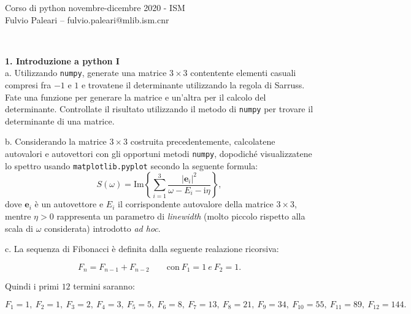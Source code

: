 \documentclass[addpoints]{exam}
\newenvironment{palatino}{\fontfamily{ppl}\selectfont}{\par}
\begin{document}
\begin{palatino}

\noindent Corso di python novembre-dicembre 2020 - ISM \\
\noindent Fulvio Paleari -- fulvio.paleari@mlib.ism.cnr

\hrulefill
\vspace{0.2in}\\
\setlength{\parindent}{0pt}

\textbf{1. Introduzione a python I} \\

a. \quad Utilizzando \texttt{numpy}, generate una matrice $3\times 3$ contentente elementi casuali compresi fra $-1$ e $1$ e trovatene il determinante utilizzando la regola di Sarruss. Fate una funzione per generare la matrice e un'altra per il calcolo del determinante. Controllate il risultato utilizzando il metodo di \texttt{numpy} per trovare il determinante di una matrice.

\hphantom{ciao}

b. Considerando la matrice $3\times 3$ costruita precedentemente, calcolatene autovalori e autovettori con gli opportuni metodi \texttt{numpy}, dopodiché visualizzatene lo spettro usando \texttt{matplotlib.pyplot} secondo la seguente formula:
\begin{equation*}
	S(\omega)= \mathrm{Im}\left\{\sum_{i=1}^3 \frac{|\mathbf{e}_i|^2}{\omega-E_i-\mathrm{i}\eta} \right\},
\end{equation*} 
dove $\mathbf{e}_i$ è un autovettore e $E_i$ il corrispondente autovalore della matrice $3\times 3$, mentre $\eta>0$ rappresenta un parametro di \textit{linewidth} (molto piccolo rispetto alla scala di $\omega$ considerata) introdotto \textit{ad hoc}.

\hphantom{ciao}

c. \quad La sequenza di Fibonacci è definita dalla seguente realazione ricorsiva:

\begin{equation*}
	F_n = F_{n-1}+F_{n-2} \qquad \mathrm{con} \ F_1 = 1 \ e \ F_2 = 1.
\end{equation*}

Quindi i primi $12$ termini saranno:

\begin{equation*}
	F_1 = 1, \
	F_2 = 1, \
	F_3 = 2, \
	F_4 = 3, \
	F_5 = 5, \
	F_6 = 8, \
	F_7 = 13, \
	F_8 = 21, \
	F_9 = 34, \
	F_{10} = 55, \
	F_{11} = 89, \
	F_{12} = 144.
\end{equation*}


\end{palatino}
\end{document}
